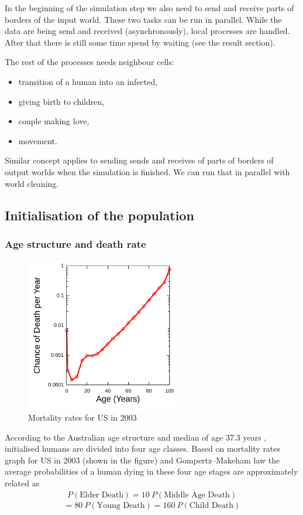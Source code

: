 \documentclass[a4paper]{article}
\newcommand*\mean[1]{\overline{#1}}
\begin{document}
In the beginning of the simulation step we also need to send and receive parts of borders of the input world.
These two tasks can be run in parallel.
While the data are being send and received (asynchronously), local processes are handled.
After that there is still some time spend by waiting (see the result section).

The rest of the processes needs neighbour cells:
\begin{itemize}
\item transition of a human into an infected,
\item giving birth to children,
\item couple making love,
\item movement.
\end{itemize}

Similar concept applies to sending sends and receives of parts of borders of output worlds when the simulation is finished.
We can run that in parallel with world cleaning.

\subsection{Initialisation of the population}

\subsubsection{Age structure and death rate}

\begin{figure}[ht]
    \centering
    \includegraphics[width=0.6\textwidth]{USGompertzCurve}
    \caption{Mortality rates for US in 2003}
\end{figure}

According to the Australian age structure\cite{agestructure} and median of age 37.3 years \cite{demographicsaustralia}, initialised humans are divided into four age classes.
Based on mortality rates graph for US in 2003 (shown in the figure) and Gompertz–Makeham law \cite{mortalitylaw} the average probabilities of a human dying in these four age stages are approximately related as 
$$ \mean{P(\text{Elder Death})} = 10\: \mean{P(\text{Middle Age Death})} $$
$$ = 80\: \mean{P(\text{Young Death})} = 160\: \mean{P(\text{Child Death})} $$
\end{document}

